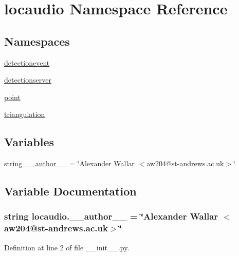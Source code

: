 \hypertarget{namespacelocaudio}{\section{locaudio Namespace Reference}
\label{namespacelocaudio}
}
\subsection*{Namespaces}
\begin{DoxyCompactItemize}
\item 
\hyperlink{namespacelocaudio_1_1detectionevent}{detectionevent}
\item 
\hyperlink{namespacelocaudio_1_1detectionserver}{detectionserver}
\item 
\hyperlink{namespacelocaudio_1_1point}{point}
\item 
\hyperlink{namespacelocaudio_1_1triangulation}{triangulation}
\end{DoxyCompactItemize}
\subsection*{Variables}
\begin{DoxyCompactItemize}
\item 
string \hyperlink{namespacelocaudio_a08bd2e574ba3b2af29ee1231a056dcc5}{\-\_\-\-\_\-author\-\_\-\-\_\-} = \char`\"{}Alexander Wallar $<$aw204@st-\/andrews.\-ac.\-uk$>$\char`\"{}
\end{DoxyCompactItemize}


\subsection{Variable Documentation}
\hypertarget{namespacelocaudio_a08bd2e574ba3b2af29ee1231a056dcc5}{
\subsubsection[{\-\_\-\-\_\-author\-\_\-\-\_\-}]{\setlength{\rightskip}{0pt plus 5cm}string locaudio.\-\_\-\-\_\-author\-\_\-\-\_\- = \char`\"{}Alexander Wallar $<$aw204@st-\/andrews.\-ac.\-uk$>$\char`\"{}}}\label{namespacelocaudio_a08bd2e574ba3b2af29ee1231a056dcc5}


Definition at line 2 of file \-\_\-\-\_\-init\-\_\-\-\_\-.\-py.


